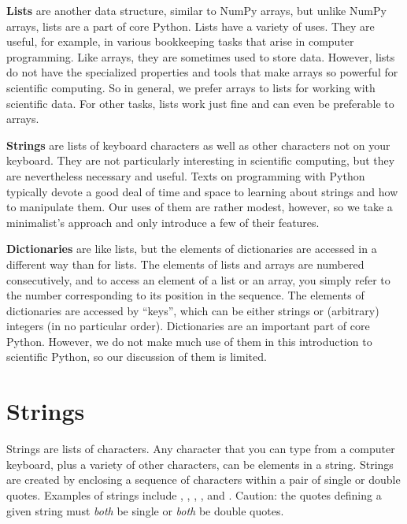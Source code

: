 \documentclass[letterpaper,10pt,english]{sphinxmanual}
\begin{document}
\textbf{Lists} are another data structure, similar to NumPy arrays, but unlike NumPy arrays, lists are a part of core Python.  Lists have a variety of uses.  They are useful, for example, in various bookkeeping tasks that arise in computer programming.  Like arrays, they are sometimes used to store data.  However, lists do not have the specialized properties and tools that make arrays so powerful for scientific computing.   So in general, we prefer arrays to lists for working with scientific data. For other tasks, lists work just fine and can even be preferable to arrays.

\textbf{Strings} are lists of keyboard characters as well as other characters not on your keyboard.  They are not particularly interesting in scientific computing, but they are nevertheless necessary and useful.  Texts on programming with Python typically devote a good deal of time and space to learning about strings and how to manipulate them.  Our uses of them are rather modest, however, so we take a minimalist's approach and only introduce a few of their features.

\textbf{Dictionaries} are like lists, but the elements of dictionaries are accessed in a different way than for lists.  The elements of lists and arrays are numbered consecutively, and to access an element of a list or an array, you simply refer to the number corresponding to its position in the sequence.  The elements of dictionaries are accessed by ``keys'', which can be either strings or (arbitrary) integers (in no particular order).  Dictionaries are an important part of core Python.  However, we do not make much use of them in this introduction to scientific Python, so our discussion of them is limited.


\section{Strings}
\label{chap3/chap3_arrays:index-4}\label{chap3/chap3_arrays:strings}
Strings are lists of characters.  Any character that you can type from a computer keyboard, plus a variety of other characters, can be elements in a string.  Strings are created by enclosing a sequence of characters within a pair of single or double quotes.  Examples of strings include , , , , and .  Caution: the quotes defining a given string must \emph{both} be single or \emph{both} be double quotes.
\end{document}
